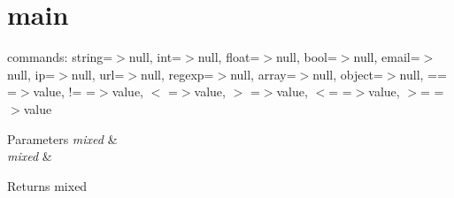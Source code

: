 \hypertarget{main-example}{\section{main}
}
commands\-: string=$>$null, int=$>$null, float=$>$null, bool=$>$null, email=$>$null, ip=$>$null, url=$>$null, regexp=$>$null, array=$>$null, object=$>$null, == =$>$value, != =$>$value, $<$ =$>$value, $>$ =$>$value, $<$= =$>$value, $>$= =$>$value


\begin{DoxyParams}{Parameters}
{\em mixed} & \\
\hline
{\em mixed} & \\
\hline
\end{DoxyParams}
\begin{DoxyReturn}{Returns}
mixed
\end{DoxyReturn}

\begin{DoxyCodeInclude}
\end{DoxyCodeInclude}
 